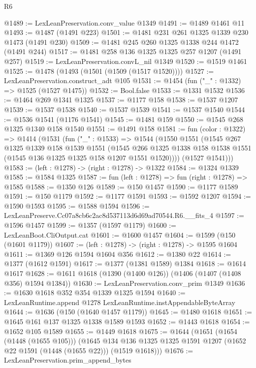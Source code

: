 \begin{lexlean}{R6}
\begin{coremodule}
@1489 := LexLeanPreservation.conv_value @1349
@1491 := @1489 @1461 @11
@1493 := @1487 (@1491 @223)
@1501 := @1481 @231 @261 @1325 @1339 @230 @1473 (@1491 @230)
@1509 := @1481 @245 @260 @1325 @1338 @244 @1472 (@1491 @244)
@1517 := @1481 @258 @136 @1325 @1325 @257 @1207 (@1491 @257)
@1519 := LexLeanPreservation.convL_nil @1349
@1520 := @1519 @1461
@1525 := @1478 (@1493 (@1501 (@1509 (@1517 @1520))))
@1527 := LexLeanPreservation.construct_adt @105
@1531 := @1454 (fun ("_" : @1332) => @1525 (@1527 @1475))
@1532 := Bool.false
@1533 := @1331 @1532
@1536 := @1464 @269 @1341 @1325
@1537 := @1177 @158
@1538 := @1537 @1207
@1539 := @1537 @1538
@1540 := @1537 @1539
@1541 := @1537 @1540
@1544 := @1536 @1541 (@1176 @1541)
@1545 := @1481 @159
@1550 := @1545 @268 @1325 @1340 @158 @1540
@1551 := @1491 @158
@1581 := fun (color : @1322) =>
  @1414
    (@1531
      (fun ("_" : @1533) =>
      @1544
        (@1550
          @1551
          (@1545
            @267
            @1325
            @1339
            @158
            @1539
            @1551
            (@1545
              @266
              @1325
              @1338
              @158
              @1538
              @1551
              (@1545 @136 @1325 @1325 @158 @1207 @1551 @1520))))
        (@1527 @1541)))
@1583 := (left : @1278) -> (right : @1278) -> @1322
@1584 := @1324 @1339
@1585 := @1584 @1325
@1587 := fun (left : @1278) => fun (right : @1278) => @1585
@1588 := @1350 @126
@1589 := @150 @1457
@1590 := @1177 @1589
@1591 := @150 @1179
@1592 := @1177 @1591
@1593 := @1592 @1207
@1594 := @1590 @1593
@1595 := @1588 @1594
@1596 := LexLeanPreserve.Cc07a8cb6c2ac8d537113d6d69ad70544.R6.__fits_4
@1597 := @1596 @1457
@1599 := @1357 (@1597 @1179)
@1600 := LexLeanBoot.CliOutput.cat
@1601 := @1600 @1457
@1604 := @1599 (@150 (@1601 @1179))
@1607 := (left : @1278) -> (right : @1278) -> @1595 @1604
@1611 := @1369 @126 @1594 @1604 @356
@1612 := @1380 @22
@1614 := @1377 (@1612 @1591)
@1617 := @1377 (@1381 @1589) @1384
@1618 := @1614 @1617
@1628 := @1611 @1618 (@1390 (@1400 @126)) (@1406 (@1407 (@1408 @356) @1594 @1384))
@1630 := LexLeanPreservation.conv_prim @1349
@1636 := @1630 @1618 @352 @354 @1339 @1325 @1594
@1640 := LexLeanRuntime.append @1278 LexLeanRuntime.instAppendableByteArray
@1644 := @1636 (@150 (@1640 @1457 @1179))
@1645 := @1480 @1618
@1651 := @1645 @161 @137 @1325 @1338 @1589 @1593
@1652 := @1443 @1618
@1654 := @1652 @105 @1589
@1655 := @1449 @1618
@1675 := @1644
    (@1651
      (@1654 (@1448 (@1655 @105)))
      (@1645 @134 @136 @1325 @1325 @1591 @1207 (@1652 @22 @1591 (@1448 (@1655 @22))) (@1519 @1618)))
@1676 := LexLeanPreservation.prim_append_bytes

\end{coremodule}
\end{lexlean}
